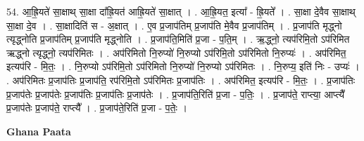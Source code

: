 \documentclass[17pt]{extarticle}
\begin{document}
54. आ॒ह्रि॒यते॑ सा॒क्षाथ् सा॒क्षा दा᳚ह्रि॒यत॑ आह्रि॒यते॑ सा॒क्षात् । . आ॒ह्रि॒यत॒ इत्या᳚ - ह्रि॒यते᳚ । . सा॒क्षा दे॒वैव सा॒क्षाथ् सा॒क्षा दे॒व । . सा॒क्षादिति॑ स - अ॒क्षात् । . ए॒व प्र॒जाप॑तिम् प्र॒जाप॑ति मे॒वैव प्र॒जाप॑तिम् । . प्र॒जाप॑ति मृद्ध्नो त्यृद्ध्नोति प्र॒जाप॑तिम् प्र॒जाप॑ति मृद्ध्नोति । . प्र॒जाप॑ति॒मिति॑ प्र॒जा - प॒ति॒म् । . ऋ॒द्ध्नो॒ त्यप॑रिमि॒तो ऽप॑रिमित ऋद्ध्नो त्यृद्ध्नो॒ त्यप॑रिमितः । . अप॑रिमितो नि॒रुप्यो॑ नि॒रुप्यो ऽप॑रिमि॒तो ऽप॑रिमितो नि॒रुप्यः॑ । . अप॑रिमित॒ इत्यप॑रि - मि॒तः॒ । . नि॒रुप्यो ऽप॑रिमि॒तो ऽप॑रिमितो नि॒रुप्यो॑ नि॒रुप्यो ऽप॑रिमितः । . नि॒रुप्य॒ इति॑ निः - उप्यः॑ । . अप॑रिमितः प्र॒जाप॑तिः प्र॒जाप॑ति॒ रप॑रिमि॒तो ऽप॑रिमितः प्र॒जाप॑तिः । . अप॑रिमित॒ इत्यप॑रि - मि॒तः॒ । . प्र॒जाप॑तिः प्र॒जाप॑तेः प्र॒जाप॑तेः प्र॒जाप॑तिः प्र॒जाप॑तिः प्र॒जाप॑तेः । . प्र॒जाप॑ति॒रिति॑ प्र॒जा - प॒तिः॒ । . प्र॒जाप॑ते॒ राप्त्या॒ आप्त्यै᳚ प्र॒जाप॑तेः प्र॒जाप॑ते॒ राप्त्यै᳚ । . प्र॒जाप॑ते॒रिति॑ प्र॒जा - प॒तेः॒ । \newline

\textbf{Ghana Paata } \newline
\end{document}
